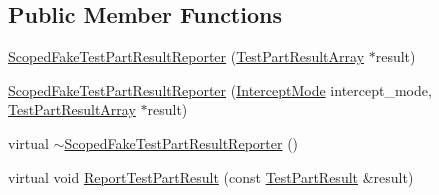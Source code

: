 \subsection*{Public Member Functions}
\begin{DoxyCompactItemize}
\item 
\hyperlink{classtesting_1_1_scoped_fake_test_part_result_reporter_aa0100ecf4799fb51d45167be6a5de1d5}{Scoped\+Fake\+Test\+Part\+Result\+Reporter} (\hyperlink{classtesting_1_1_test_part_result_array}{Test\+Part\+Result\+Array} $\ast$result)
\item 
\hyperlink{classtesting_1_1_scoped_fake_test_part_result_reporter_a57cbc09ed48627c8a73e622618dc4b4f}{Scoped\+Fake\+Test\+Part\+Result\+Reporter} (\hyperlink{classtesting_1_1_scoped_fake_test_part_result_reporter_a82f6209b3cf5c4b15ec8bd8041dbc2d5}{Intercept\+Mode} intercept\+\_\+mode, \hyperlink{classtesting_1_1_test_part_result_array}{Test\+Part\+Result\+Array} $\ast$result)
\item 
virtual \hyperlink{classtesting_1_1_scoped_fake_test_part_result_reporter_a916585996236c45e447546a3bcc0796c}{$\sim$\+Scoped\+Fake\+Test\+Part\+Result\+Reporter} ()
\item 
virtual void \hyperlink{classtesting_1_1_scoped_fake_test_part_result_reporter_a3bc6cb939cbc3db71ece8846e6bafe00}{Report\+Test\+Part\+Result} (const \hyperlink{classtesting_1_1_test_part_result}{Test\+Part\+Result} \&result)
\end{DoxyCompactItemize}


